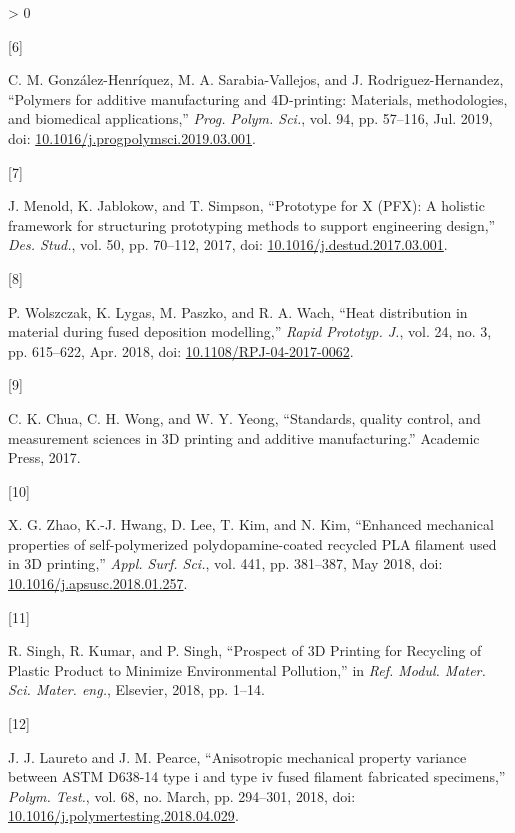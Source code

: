 \documentclass[conference,final,]{IEEEtran}
\newlength{\csllabelwidth}
\newlength{\cslhangindent}
\newenvironment{CSLReferences}[3] %
 {%
  \setlength{\parindent}{0pt}
  \ifodd #1 \everypar{\setlength{\hangindent}{\cslhangindent}}\ignorespaces\fi
  \ifnum #2 > 0
  \setlength{\parskip}{#2\baselineskip}
  \fi
 }%
 {}
\newcommand{\CSLLeftMargin}[1]{\parbox[t]{\csllabelwidth}{#1}}
\newcommand{\CSLRightInline}[1]{\parbox[t]{\linewidth - \csllabelwidth}{#1}}
\begin{document}
\begin{CSLReferences}{0}{0}
\leavevmode\hypertarget{ref-GonzalezHenriquez2019}{}%
\CSLLeftMargin{{[}6{]} }
\CSLRightInline{C. M. González-Henríquez, M. A. Sarabia-Vallejos, and J.
Rodriguez-Hernandez, {``{Polymers for additive manufacturing and
4D-printing: Materials, methodologies, and biomedical applications},''}
\emph{Prog. Polym. Sci.}, vol. 94, pp. 57--116, Jul. 2019, doi:
\href{https://doi.org/10.1016/j.progpolymsci.2019.03.001}{10.1016/j.progpolymsci.2019.03.001}.}

\leavevmode\hypertarget{ref-Menold2017}{}%
\CSLLeftMargin{{[}7{]} }
\CSLRightInline{J. Menold, K. Jablokow, and T. Simpson, {``{Prototype
for X (PFX): A holistic framework for structuring prototyping methods to
support engineering design},''} \emph{Des. Stud.}, vol. 50, pp. 70--112,
2017, doi:
\href{https://doi.org/10.1016/j.destud.2017.03.001}{10.1016/j.destud.2017.03.001}.}

\leavevmode\hypertarget{ref-Wolszczak2018}{}%
\CSLLeftMargin{{[}8{]} }
\CSLRightInline{P. Wolszczak, K. Lygas, M. Paszko, and R. A. Wach,
{``{Heat distribution in material during fused deposition modelling},''}
\emph{Rapid Prototyp. J.}, vol. 24, no. 3, pp. 615--622, Apr. 2018, doi:
\href{https://doi.org/10.1108/RPJ-04-2017-0062}{10.1108/RPJ-04-2017-0062}.}

\leavevmode\hypertarget{ref-Chua2017}{}%
\CSLLeftMargin{{[}9{]} }
\CSLRightInline{C. K. Chua, C. H. Wong, and W. Y. Yeong, {``{Standards,
quality control, and measurement sciences in 3D printing and additive
manufacturing}.''} Academic Press, 2017.}

\leavevmode\hypertarget{ref-Zhao2018a}{}%
\CSLLeftMargin{{[}10{]} }
\CSLRightInline{X. G. Zhao, K.-J. Hwang, D. Lee, T. Kim, and N. Kim,
{``{Enhanced mechanical properties of self-polymerized
polydopamine-coated recycled PLA filament used in 3D printing},''}
\emph{Appl. Surf. Sci.}, vol. 441, pp. 381--387, May 2018, doi:
\href{https://doi.org/10.1016/j.apsusc.2018.01.257}{10.1016/j.apsusc.2018.01.257}.}

\leavevmode\hypertarget{ref-Singh2018e}{}%
\CSLLeftMargin{{[}11{]} }
\CSLRightInline{R. Singh, R. Kumar, and P. Singh, {``{Prospect of 3D
Printing for Recycling of Plastic Product to Minimize Environmental
Pollution},''} in \emph{Ref. Modul. Mater. Sci. Mater. eng.}, Elsevier,
2018, pp. 1--14.}

\leavevmode\hypertarget{ref-Laureto2018}{}%
\CSLLeftMargin{{[}12{]} }
\CSLRightInline{J. J. Laureto and J. M. Pearce, {``{Anisotropic
mechanical property variance between ASTM D638-14 type i and type iv
fused filament fabricated specimens},''} \emph{Polym. Test.}, vol. 68,
no. March, pp. 294--301, 2018, doi:
\href{https://doi.org/10.1016/j.polymertesting.2018.04.029}{10.1016/j.polymertesting.2018.04.029}.}


\end{CSLReferences}
\end{document}
